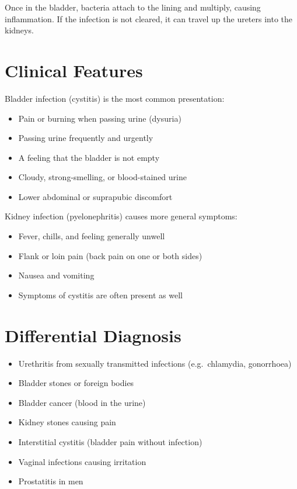 Once in the bladder, bacteria attach to the lining and multiply, causing inflammation. If the infection is not cleared, it can travel up the ureters into the kidneys.

\section*{Clinical Features}
Bladder infection (cystitis) is the most common presentation:
\begin{itemize}
    \item Pain or burning when passing urine (dysuria)
    \item Passing urine frequently and urgently
    \item A feeling that the bladder is not empty
    \item Cloudy, strong-smelling, or blood-stained urine
    \item Lower abdominal or suprapubic discomfort
\end{itemize}

Kidney infection (pyelonephritis) causes more general symptoms:
\begin{itemize}
    \item Fever, chills, and feeling generally unwell
    \item Flank or loin pain (back pain on one or both sides)
    \item Nausea and vomiting
    \item Symptoms of cystitis are often present as well
\end{itemize}

\section*{Differential Diagnosis}
\begin{itemize}
    \item Urethritis from sexually transmitted infections (e.g.\ chlamydia, gonorrhoea)
    \item Bladder stones or foreign bodies
    \item Bladder cancer (blood in the urine)
    \item Kidney stones causing pain
    \item Interstitial cystitis (bladder pain without infection)
    \item Vaginal infections causing irritation
    \item Prostatitis in men
\end{itemize}

